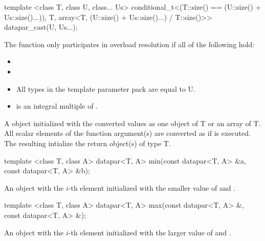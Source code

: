 \begin{itemdecl}
template <class T, class U, class... Us>
conditional_t<(T::size() == (U::size() + Us::size()...)), T,
            array<T, (U::size() + Us::size()...) / T::size()>> datapar_cast(U, Us...);
\end{itemdecl}
\begin{itemdescr}
  \pnum\remarks The  function only participates in overload resolution if all of the following hold:
  \begin{itemize}
    \item {}
    \item {}
    \item All types in the template parameter pack  are equal to \type U.
    \item {} is an integral multiple of .
  \end{itemize}

  \pnum\returns A \datapar object initialized with the converted values as one object of \type T or an array of \type T.
  All scalar elements  of the function argument(s) are converted as if
   is executed.
  The resulting  intialize the return object(s) of type \type T.
\end{itemdescr}

\begin{itemdecl}
template <class T, class A>
datapar<T, A> min(const datapar<T, A> &a, const datapar<T, A> &b);
\end{itemdecl}
\begin{itemdescr}
  \pnum\returns An object with the $i$-th element initialized with the smaller value of  and  \foralli.
\end{itemdescr}

\begin{itemdecl}
template <class T, class A>
datapar<T, A> max(const datapar<T, A> &, const datapar<T, A> &);
\end{itemdecl}
\begin{itemdescr}
  \pnum\returns An object with the $i$-th element initialized with the larger value of  and  \foralli.
\end{itemdescr}

